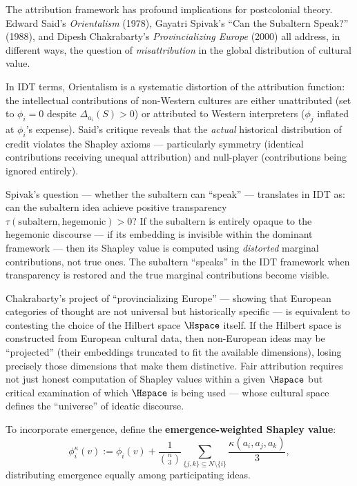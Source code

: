 \begin{interpretation}
\label{interp:ch21:postcolonial_attribution}
The attribution framework has profound implications for postcolonial
theory.  Edward Said's \textit{Orientalism} (1978), Gayatri Spivak's
``Can the Subaltern Speak?'' (1988), and Dipesh Chakrabarty's
\textit{Provincializing Europe} (2000) all address, in different ways,
the question of \emph{misattribution} in the global distribution of
cultural value.

In IDT terms, Orientalism is a systematic distortion of the attribution
function: the intellectual contributions of non-Western cultures are
either unattributed (set to $\phi_i = 0$ despite $\Delta_{a_i}(S) > 0$)
or attributed to Western interpreters ($\phi_j$ inflated at $\phi_i$'s
expense).  Said's critique reveals that the \emph{actual} historical
distribution of credit violates the Shapley axioms --- particularly
symmetry (identical contributions receiving unequal attribution) and
null-player (contributions being ignored entirely).

Spivak's question --- whether the subaltern can ``speak'' --- translates
in IDT as: can the subaltern idea achieve positive transparency
$\tau(\text{subaltern}, \text{hegemonic}) > 0$?  If the subaltern is
entirely opaque to the hegemonic discourse --- if its embedding is
invisible within the dominant framework --- then its Shapley value is
computed using \emph{distorted} marginal contributions, not true ones.
The subaltern ``speaks'' in the IDT framework when transparency is
restored and the true marginal contributions become visible.

Chakrabarty's project of ``provincializing Europe'' --- showing that
European categories of thought are not universal but historically
specific --- is equivalent to contesting the choice of the Hilbert
space $\Hspace$ itself.  If the Hilbert space is constructed from
European cultural data, then non-European ideas may be ``projected''
(their embeddings truncated to fit the available dimensions), losing
precisely those dimensions that make them distinctive.  Fair attribution
requires not just honest computation of Shapley values within a given
$\Hspace$ but critical examination of which $\Hspace$ is being used ---
whose cultural space defines the ``universe'' of ideatic discourse.
\end{interpretation}

\begin{definition}
\label{def:emergence-shapley}
To incorporate emergence, define the \textbf{emergence-weighted Shapley
value}:
\[
  \phi_i^{\kappa}(v) := \phi_i(v) + \frac{1}{\binom{n}{3}}
  \sum_{\{j,k\} \subseteq N \setminus \{i\}}
  \frac{\kappa(a_i, a_j, a_k)}{3},
\]
distributing emergence equally among participating ideas.
\end{definition}

